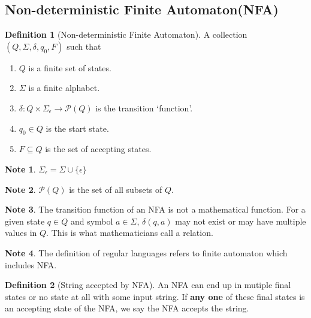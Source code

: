\documentclass[10pt, a4paper]{extarticle}
\theoremstyle{definition}
\newtheorem{defn}{Definition}
\newtheorem*{note*}{Note}
\begin{document}
\subsection{Non-deterministic Finite Automaton(NFA)}
\begin{defn}[Non-deterministic Finite Automaton]
	A collection $(Q,\Sigma,\delta,q_0,F)$ such that
	\begin{enumerate}
		\item $Q$ is a finite set of states.
		\item $\Sigma$ is a finite alphabet.
		\item $\delta:Q\times\Sigma_\epsilon\to \mathcal{P}(Q)$ is the transition `function'.
		\item $q_0\in Q$ is the start state.
		\item $F\subseteq Q$ is the set of accepting states.
	\end{enumerate}
\end{defn}
\begin{note*}
	$\Sigma_\epsilon=\Sigma\cup\{\epsilon\}$
\end{note*}
\begin{note*}
	$\mathcal{P}(Q)$ is the set of all subsets of $Q$.
\end{note*}
\begin{note*}
	The transition function of an NFA is not a mathematical function. For a given state $q\in Q$ and symbol $a\in\Sigma$, $\delta(q,a)$ may not exist or may have multiple values in $Q$. This is what mathematicians call a relation.
\end{note*}

\begin{note*}
	The definition of regular languages refers to finite automaton which includes NFA.
\end{note*}

\begin{defn}[String accepted by NFA]
	An NFA can end up in mutiple final states or no state at all with some input string. If \textbf{any one} of these final states is an accepting state of the NFA, we say the NFA accepts the string.
\end{defn}
\end{document}
